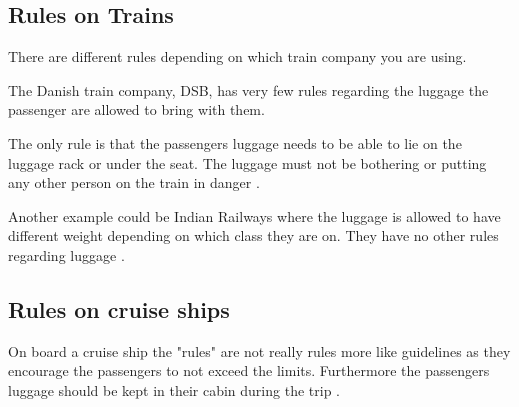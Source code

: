 \subsection{Rules on Trains}

There are different rules depending on which train company you are using. 

The Danish train company, DSB, has very few rules regarding the luggage the passenger are allowed to bring with them. 


The only rule is that the passengers luggage needs to be able to lie on the luggage rack or under the seat. The luggage must not be bothering or putting any other person on the train in danger \citep{rulestrain}.


Another example could be Indian Railways where the luggage is allowed to have different weight depending on which class they are on. They have no other rules regarding luggage \citep{idianrules}.

\subsection{Rules on cruise ships}
On board a cruise ship the "rules" are not really rules more like guidelines as they encourage the passengers to not exceed the limits. Furthermore the passengers luggage should be kept in their cabin during the trip \citep{Cruise}.
